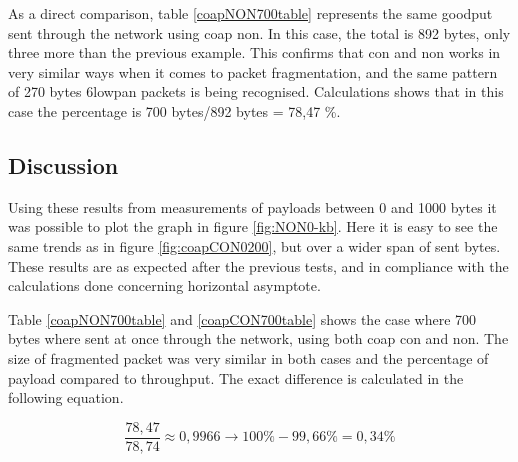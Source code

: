 \noindent As a direct comparison, table \ref{coapNON700table} represents the same \gls{goodput} sent through the network using \gls{coap} \gls{non}. In this case, the total is 892 bytes, only three more than the previous example. This confirms that \gls{con} and \gls{non} works in very similar ways when it comes to packet fragmentation, and the same pattern of 270 bytes \gls{6lowpan} packets is being recognised. Calculations shows that in this case the percentage is 700 bytes/892 bytes = 78,47 \%. 



\subsection{Discussion}

\noindent Using these results from measurements of \glspl{payload} between 0 and 1000 bytes it was possible to plot the graph in figure \ref{fig:NON0-kb}. Here it is easy to see the same trends as in figure \ref{fig:coapCON0200}, but over a wider span of sent bytes. These results are as expected after the previous tests, and in compliance with the calculations done concerning horizontal asymptote.  


\noindent Table \ref{coapNON700table} and \ref{coapCON700table} shows the case where 700 bytes where sent at once through the network, using both \gls{coap} \gls{con} and \gls{non}. The size of fragmented packet was very similar in both cases and the percentage of \gls{payload} compared to \gls{throughput}. The exact difference is calculated in the following equation. 

\begin{equation} \label{lessThanHAlfAPercentCalculation}
    \frac{78,47}{78,74} \approx 0,9966  \rightarrow 100 \% - 99,66 \% = 0,34 \%
\end{equation}

